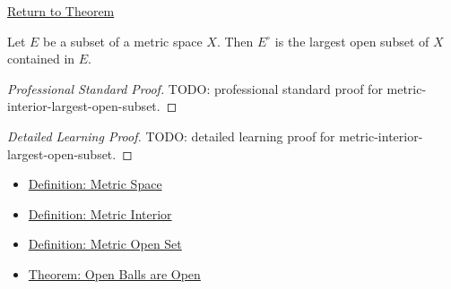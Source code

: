 \newpage
{}
\label{prf:metric-interior-largest-open-subset}

\begin{remark*}[Return]
\hyperref[thm:metric-interior-largest-open-subset]{Return to Theorem}
\end{remark*}

\begin{theorem*}
Let \(E\) be a subset of a metric space \(X\).  Then \(E^\circ\) is the
largest open subset of \(X\) contained in \(E\).
\end{theorem*}

\begin{proof}[Professional Standard Proof]
\LRAProofBodyStart
TODO: professional standard proof for metric-interior-largest-open-subset.
\end{proof}

\begin{proof}[Detailed Learning Proof]
\LRAProofBodyStart
TODO: detailed learning proof for metric-interior-largest-open-subset.
\end{proof}

\begin{remark*}
\end{remark*}

\begin{dependencies}
\begin{itemize}
  \item \hyperref[def:metric-space]{Definition: Metric Space}
  \item \hyperref[def:metric-interior]{Definition: Metric Interior}
  \item \hyperref[def:metric-open-set]{Definition: Metric Open Set}
  \item \hyperref[thm:metric-open-balls-are-open]{Theorem: Open Balls are Open}
\end{itemize}
\end{dependencies}

\clearpage
